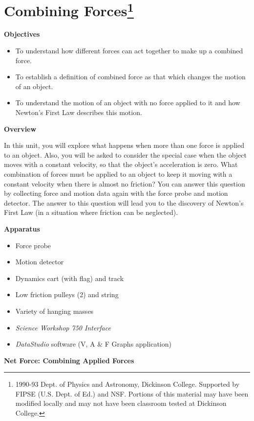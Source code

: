 
\section{Combining Forces\footnote{
1990-93 Dept. of Physics and Astronomy, Dickinson College. Supported by FIPSE
(U.S. Dept. of Ed.) and NSF. Portions of this material may have been modified
locally and may not have been classroom tested at Dickinson College.
}}

\makelabheader %

\textbf{Objectives}

\begin{itemize}
\item To understand how different forces can act together to make up a combined force.~ 
\item To establish a definition of combined force as that which changes the motion
of an object.
\item To understand the motion of an object with no force applied to it and how Newton's
First Law describes this motion.
\end{itemize}
\textbf{Overview}

In this unit, you will explore what happens when more than one force is applied
to an object. Also, you will be asked to consider the special case when the
object moves with a constant velocity, so that the object's acceleration is
zero. What combination of forces must be applied to an object to keep it moving
with a constant velocity when there is almost no friction? You can answer this
question by collecting force and motion data again with the force probe and
motion detector. The answer to this question will lead you to the discovery
of Newton's First Law (in a situation where friction can be neglected).

\textbf{Apparatus}

\begin{itemize}
\item Force probe
\item Motion detector
\item Dynamics cart (with flag) and track
\item Low friction pulleys (2) and string
\item Variety of hanging masses
\item \textit{Science Workshop 750 Interface}
\item \textit{DataStudio} software (V, A \& F Graphs application)
\end{itemize}
\textbf{Net Force: Combining Applied Forces }

